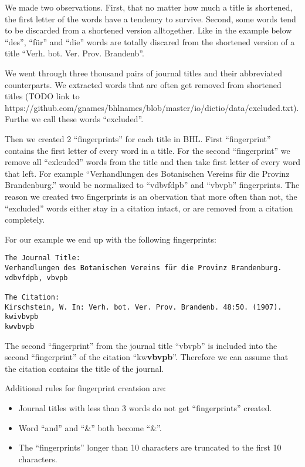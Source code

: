 \documentclass[
]{article}
\providecommand{\tightlist}{%
  \setlength{\itemsep}{0pt}\setlength{\parskip}{0pt}}
\begin{document}
We made two observations. First, that no matter how much a title is
shortened, the first letter of the words have a tendency to survive.
Second, some words tend to be discarded from a shortened version
alltogether. Like in the example below ``des'', ``für'' and ``die''
words are totally discared from the shortened version of a title ``Verh.
bot. Ver. Prov. Brandenb''.

We went through three thousand pairs of journal titles and their
abbreviated counterparts. We extracted words that are often get removed
from shortened titles (TODO link to
https://github.com/gnames/bhlnames/blob/master/io/dictio/data/excluded.txt).
Furthe we call these words ``excluded''.

Then we created 2 ``fingerprints'' for each title in BHL. First
``fingerprint'' contains the first letter of every word in a title. For
the second ``fingerprint'' we remove all ``exlcuded'' words from the
title and then take first letter of every word that left. For example
``Verhandlungen des Botanischen Vereins für die Provinz Brandenburg.''
would be normalized to ``vdbvfdpb'' and ``vbvpb'' fingerprints. The
reason we created two fingerprints is an obervation that more often than
not, the ``excluded'' words either stay in a citation intact, or are
removed from a citation completely.

For our example we end up with the following fingerprints:

\begin{verbatim}
The Journal Title:
Verhandlungen des Botanischen Vereins für die Provinz Brandenburg.
vdbvfdpb, vbvpb

The Citation:
Kirschstein, W. In: Verh. bot. Ver. Prov. Brandenb. 48:50. (1907).
kwivbvpb
kwvbvpb
\end{verbatim}

The second ``fingerprint'' from the journal title ``vbvpb'' is included
into the second ``fingerprint'' of the citation ``kw\textbf{vbvpb}''.
Therefore we can assume that the citation contains the title of the
journal.

Additional rules for fingerprint creatsion are:

\begin{itemize}
\tightlist
\item
  Journal titles with less than 3 words do not get ``fingerprints''
  created.
\item
  Word ``and'' and ``\&'' both become ``\&''.
\item
  The ``fingerprints'' longer than 10 characters are truncated to the
  first 10 characters.
\end{itemize}
\end{document}
